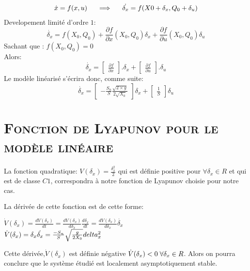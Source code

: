 \[\dot{x}=f(x,u) \indent \Longrightarrow \indent \dot{\delta_x}=f(X0+\delta_x ,Q_0+\delta_u)\]
Developement limité d'ordre $1$:\\
\[\dot{\delta_x}=f(X_0,Q_0)+\frac{\partial f}{ \partial x}(X_0,Q_0)\delta_x + \frac{\partial f}{\partial u}(X_0,Q_0) \delta_u\]
Sachant que : \indent \indent $f(X_0,Q_0)=0$\\
Alors:
\[\dot{\delta_x}=\begin{bmatrix}\frac{\partial f}{ \partial x }\end{bmatrix}.\delta_x + \begin{bmatrix}\frac{\partial f}{\partial u}\end{bmatrix}.\delta_u\]
Le modèle linéarisé s'écrira donc, comme suite:\\

\[\dot{\delta_x}=\begin{bmatrix}-\frac{S_n}{S}\frac{\sqrt{2\times g}}{2\sqrt{X_0}}\end{bmatrix}\delta_x+\begin{bmatrix}\frac{1}{S}\end{bmatrix}\delta_u\]


\section{\textsc{Fonction de Lyapunov pour le modèle linéaire}}

	\paragraph{}
	La fonction quadratique: $V(\delta_x)=\frac{\delta_x^2}{2}$ qui est définie positive pour $\forall \delta_x \in R $ et qui est de classe $C1$, correspondra à notre fonction de Lyapunov choisie pour notre cas.\\

	\par	 La dérivée de cette fonction est de cette forme: 
	\begin{center}
		$\dot{V}(\delta_x) = \frac{dV(\delta_x)}{dt} = \frac{dV(\delta_x)}{d\delta_x} \frac{d\delta_x}{dt} = \frac{dV(\delta_x)}{d\delta_x} \dot{\delta_x} $\\[0.25 cm]
		$ \dot{V}(\delta_x) = \delta_x \dot{\delta_x} = \frac{-S_n}{S} \sqrt{\frac{g}{2X_0}} \\delta_x^2 $\\[0.25 cm]
	\end{center} 
	\par Cette dérivée,$\dot{V}(\delta_x)$ est définie négative $\dot{V}(\delta_x)<0 \hspace{1mm} \forall \delta_x \in R $. Alors on pourra conclure que le système étudié est localement asymptotiquement stable.
	
